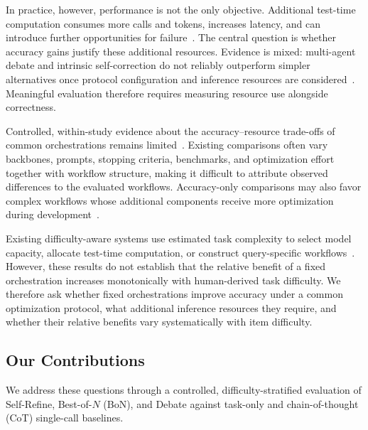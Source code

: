 \documentclass[a4paper]{article}
\theoremstyle{plain}
\theoremstyle{definition}
\theoremstyle{remark}
\begin{document}
In practice, however, performance is not the only objective.
Additional test-time computation consumes more calls and tokens, increases latency, and can introduce further opportunities for failure~\citep{du_survey_2026,cemri_why_2025}.
The central question is whether accuracy gains justify these additional resources.
Evidence is mixed: multi-agent debate and intrinsic self-correction do not reliably outperform simpler alternatives once protocol configuration and inference resources are considered~\citep{smit_should_2024,huang_large_2023}.
Meaningful evaluation therefore requires measuring resource use alongside correctness.

Controlled, within-study evidence about the accuracy--resource trade-offs of common orchestrations remains limited~\citep{du_survey_2026,fang_comprehensive_2025,bai_mas-promptbench_2026}.
Existing comparisons often vary backbones, prompts, stopping criteria, benchmarks, and optimization effort together with workflow structure, making it difficult to attribute observed differences to the evaluated workflows.
Accuracy-only comparisons may also favor complex workflows whose additional components receive more optimization during development~\citep{bai_mas-promptbench_2026}.

Existing difficulty-aware systems use estimated task complexity to select model capacity, allocate test-time computation, or construct query-specific workflows~\citep{bae_complexitynet_2023,cheng_adaptivellm_2025,snell_scaling_2025,su_difficulty-aware_2026,zhang_multi-agent_2025}.
However, these results do not establish that the relative benefit of a fixed orchestration increases monotonically with human-derived task difficulty.
We therefore ask whether fixed orchestrations improve accuracy under a common optimization protocol, what additional inference resources they require, and whether their relative benefits vary systematically with item difficulty.

\subsection{Our Contributions}
\label{sec:contributions}

We address these questions through a controlled, difficulty-stratified evaluation of Self-Refine, Best-of-$N$ (BoN), and Debate against task-only and chain-of-thought (CoT) single-call baselines.
\end{document}
